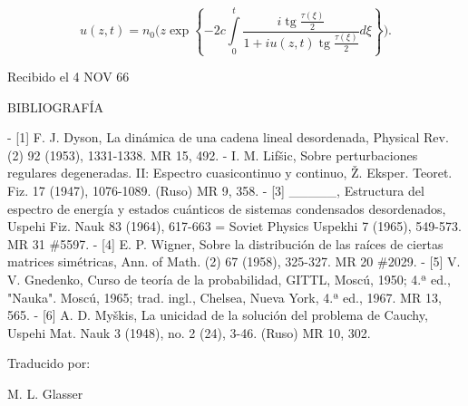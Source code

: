 \documentclass[11pt,a4paper]{article}
\begin{document}
$$u\left(z,t\right)=n_{0}\Bigg(z\exp\left\{-2c\int\limits_{0}^{t}\frac{i\operatorname{tg}\frac{\tau\left(\xi\right)}{2}}{1+iu\left(z,t\right)\operatorname{tg}\frac{\tau\left(\xi\right)}{2}}d\xi\right\}\Bigg).$$

Recibido el 4 NOV 66

BIBLIOGRAFÍA

- [1] F. J. Dyson, La dinámica de una cadena lineal desordenada, Physical Rev. (2) 92 (1953), 1331-1338. MR 15, 492.
- I. M. Lifšic, Sobre perturbaciones regulares degeneradas. II: Espectro cuasicontinuo y continuo,
   Ž. Eksper. Teoret. Fiz. 17 (1947), 1076-1089. (Ruso) MR 9, 358.
- [3] \_\_\_\_\_, Estructura del espectro de energía y estados cuánticos de sistemas condensados desordenados, Uspehi Fiz. Nauk 83 (1964), 617-663 = Soviet Physics Uspekhi 7 (1965), 549-573. MR 31 \#5597.
- [4] E. P. Wigner, Sobre la distribución de las raíces de ciertas matrices simétricas, Ann. of Math. (2) 67 (1958), 325-327. MR 20 \#2029.
- [5] V. V. Gnedenko, Curso de teoría de la probabilidad, GITTL, Moscú, 1950; 4.ª ed., "Nauka". Moscú, 1965; trad. ingl., Chelsea, Nueva York, 4.ª ed., 1967. MR 13, 565.
- [6] A. D. Myškis, La unicidad de la solución del problema de Cauchy, Uspehi Mat. Nauk 3 (1948), no. 2 (24), 3-46. (Ruso) MR 10, 302.

Traducido por:

M. L. Glasser
\end{document}
